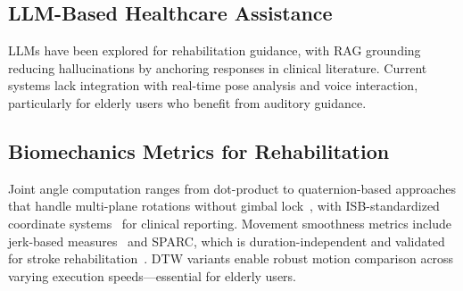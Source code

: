 \subsection{LLM-Based Healthcare Assistance}
LLMs have been explored for rehabilitation guidance, with RAG grounding~\cite{lewis2020retrieval} reducing hallucinations by anchoring responses in clinical literature. Current systems lack integration with real-time pose analysis and voice interaction, particularly for elderly users who benefit from auditory guidance.

\subsection{Biomechanics Metrics for Rehabilitation}
Joint angle computation ranges from dot-product to quaternion-based approaches that handle multi-plane rotations without gimbal lock~\cite{Pirek2017}, with ISB-standardized coordinate systems~\cite{Wu2002} for clinical reporting. Movement smoothness metrics include jerk-based measures~\cite{Rohrer2002} and SPARC, which is duration-independent and validated for stroke rehabilitation~\cite{Scholp2021}. DTW variants enable robust motion comparison across varying execution speeds---essential for elderly users.
